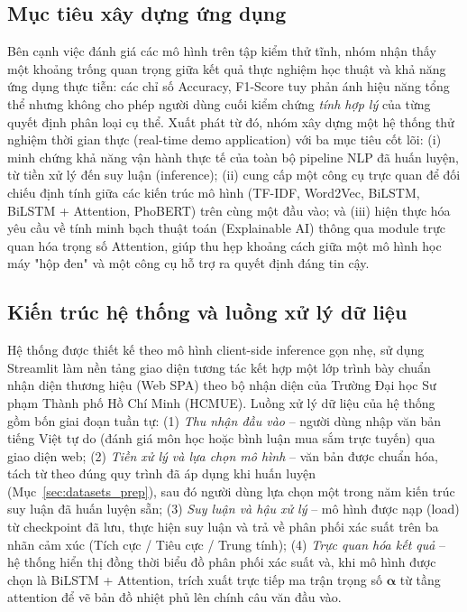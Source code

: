 \documentclass[12pt,a4paper]{article}
\begin{document}
\subsection{Mục tiêu xây dựng ứng dụng}\label{sec:demo_objective}
Bên cạnh việc đánh giá các mô hình trên tập kiểm thử tĩnh, nhóm nhận thấy một khoảng trống quan trọng giữa kết quả thực nghiệm học thuật và khả năng ứng dụng thực tiễn: các chỉ số Accuracy, F1-Score tuy phản ánh hiệu năng tổng thể nhưng không cho phép người dùng cuối kiểm chứng \textit{tính hợp lý} của từng quyết định phân loại cụ thể. Xuất phát từ đó, nhóm xây dựng một hệ thống thử nghiệm thời gian thực (real-time demo application) với ba mục tiêu cốt lõi: (i) minh chứng khả năng vận hành thực tế của toàn bộ pipeline NLP đã huấn luyện, từ tiền xử lý đến suy luận (inference); (ii) cung cấp một công cụ trực quan để đối chiếu định tính giữa các kiến trúc mô hình (TF-IDF, Word2Vec, BiLSTM, BiLSTM + Attention, PhoBERT) trên cùng một đầu vào; và (iii) hiện thực hóa yêu cầu về tính minh bạch thuật toán (Explainable AI) thông qua module trực quan hóa trọng số Attention, giúp thu hẹp khoảng cách giữa một mô hình học máy "hộp đen" và một công cụ hỗ trợ ra quyết định đáng tin cậy.

\subsection{Kiến trúc hệ thống và luồng xử lý dữ liệu}\label{sec:demo_architecture}
Hệ thống được thiết kế theo mô hình client-side inference gọn nhẹ, sử dụng Streamlit làm nền tảng giao diện tương tác kết hợp một lớp trình bày chuẩn nhận diện thương hiệu (Web SPA) theo bộ nhận diện của Trường Đại học Sư phạm Thành phố Hồ Chí Minh (HCMUE). Luồng xử lý dữ liệu của hệ thống gồm bốn giai đoạn tuần tự: (1) \textit{Thu nhận đầu vào} -- người dùng nhập văn bản tiếng Việt tự do (đánh giá môn học hoặc bình luận mua sắm trực tuyến) qua giao diện web; (2) \textit{Tiền xử lý và lựa chọn mô hình} -- văn bản được chuẩn hóa, tách từ theo đúng quy trình đã áp dụng khi huấn luyện (Mục~\ref{sec:datasets_prep}), sau đó người dùng lựa chọn một trong năm kiến trúc suy luận đã huấn luyện sẵn; (3) \textit{Suy luận và hậu xử lý} -- mô hình được nạp (load) từ checkpoint đã lưu, thực hiện suy luận và trả về phân phối xác suất trên ba nhãn cảm xúc (Tích cực / Tiêu cực / Trung tính); (4) \textit{Trực quan hóa kết quả} -- hệ thống hiển thị đồng thời biểu đồ phân phối xác suất và, khi mô hình được chọn là BiLSTM + Attention, trích xuất trực tiếp ma trận trọng số $\boldsymbol{\alpha}$ từ tầng attention để vẽ bản đồ nhiệt phủ lên chính câu văn đầu vào.
\end{document}
